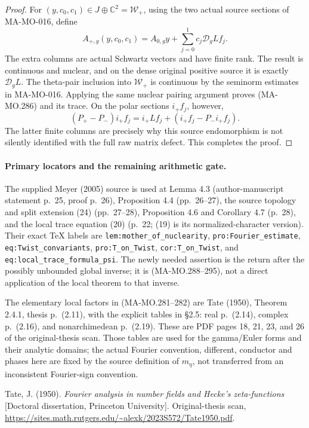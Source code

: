 \begin{proof}
For \((y,c_0,c_1)\in J\oplus\mathbb C^2=\mathcal W_+\),
using the two actual source sections of MA-MO-016, define
\[
 A_{+,g}(y,c_0,c_1)
       =A_{0,g}y+\sum_{j=0}^1c_j\mathcal D_gLf_j.
 \tag{MA-MO.298}
\]
The extra columns are actual Schwartz vectors and have finite
rank. The result is continuous and nuclear, and on the dense
original positive source it is exactly \(\mathcal D_gL\).
The theta-pair inclusion into \(\mathcal W_+\) is continuous
by the seminorm estimates in MA-MO-016. Applying the same
nuclear pairing argument proves (MA-MO.286) and its trace.
On the polar sections \(i_+f_j\), however,
\[
 (P_+-P_-)i_+f_j
       =i_+Lf_j+(i_+f_j-P_-i_+f_j).
 \tag{MA-MO.299}
\]
The latter finite columns are precisely why this source
endomorphism is not silently identified with the full raw
matrix defect. This completes the proof.
\end{proof}

\paragraph{Primary locators and the remaining arithmetic gate.}
The supplied Meyer (2005) source is used at Lemma 4.3
(author-manuscript statement p.~25, proof p.~26),
Proposition 4.4 (pp.~26--27),
the source topology and split extension (24) (pp.~27--28),
Proposition 4.6 and Corollary 4.7 (p.~28), and the
local trace equation (20) (p.~22; (19) is its normalized-character
version). Their exact TeX labels are
\texttt{lem:mother\_of\_nuclearity},
\texttt{pro:Fourier\_estimate},
\texttt{eq:Twist\_convariants},
\texttt{pro:T\_on\_Twist}, \texttt{cor:T\_on\_Twist}, and
\texttt{eq:local\_trace\_formula\_psi}.
The newly needed assertion is the return after the possibly
unbounded global inverse; it is (MA-MO.288--295), not a direct
application of the local theorem to that inverse.

The elementary local factors in (MA-MO.281--282) are Tate
(1950), Theorem 2.4.1, thesis p.~(2.11), with the explicit
tables in \S2.5: real p.~(2.14), complex p.~(2.16), and
nonarchimedean p.~(2.19). These are PDF pages 18, 21, 23,
and 26 of the original-thesis scan. Those tables are used for
the gamma/Euler forms and their analytic domains; the actual
Fourier convention, different, conductor and phases here are
fixed by the source definition of \(m_\eta\), not transferred
from an inconsistent Fourier-sign convention.

\smallskip
\noindent Tate, J. (1950). \emph{Fourier analysis in number
fields and Hecke's zeta-functions} [Doctoral dissertation,
Princeton University]. Original-thesis scan,
\url{https://sites.math.rutgers.edu/~alexk/2023S572/Tate1950.pdf}.

